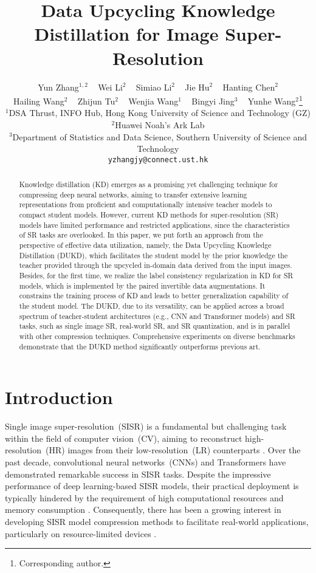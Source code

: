 \documentclass[10pt,twocolumn,letterpaper]{article}
\title{Data Upcycling Knowledge Distillation for Image Super-Resolution}
\author{\hspace{-0.4cm}Yun Zhang$^{1,2}$ ~ Wei Li$^{2}$  ~ Simiao Li$^{2}$ ~ Jie Hu$^{2}$ ~ Hanting Chen$^{2}$\\
	\hspace{-0.4cm}Hailing Wang$^{2}$ ~ Zhijun Tu$^{2}$ ~ Wenjia Wang$^{1}$ ~ Bingyi Jing$^{3}$ ~ Yunhe Wang$^{2}$\thanks{Corresponding author.}\\
	$^{1}$DSA Thrust, INFO Hub, Hong Kong University of Science and Technology (GZ)\\
	$^{2}$Huawei Noah's Ark Lab\\
	$^{3}$Department of Statistics and Data Science, Southern University of Science and Technology\\
	{\tt\hspace{-0.6cm}yzhangjy@connect.ust.hk}\quad\quad {\tt\{wei.lee, lisimiao\}@huawei.com}
}
\begin{document}
\maketitle

\begin{abstract}
\noindent Knowledge distillation (KD) emerges as a  promising yet challenging technique for compressing deep neural networks, aiming to transfer extensive learning representations from proficient and computationally intensive teacher models to compact student models.
However, current KD methods for super-resolution (SR) models have limited performance and restricted applications, since the characteristics of SR tasks are overlooked.
In this paper, we put forth an approach from the perspective of effective data utilization, namely, the Data Upcycling Knowledge Distillation (DUKD), which facilitates the student model by the prior knowledge the teacher provided through the upcycled in-domain data derived from the input images.
Besides, for the first time, we realize the label consistency regularization in KD for SR models, which is implemented by the paired invertible data augmentations. It constrains the training process of KD and leads to better generalization capability of  the student model.
The DUKD, due to its versatility, can be applied across a broad spectrum of teacher-student architectures (e.g., CNN and Transformer models) and SR tasks, such as single image SR, real-world SR, and SR quantization, and is in parallel with other compression techniques. 
Comprehensive experiments on diverse benchmarks demonstrate that the DUKD method significantly outperforms previous art.
\end{abstract} \section{Introduction}\label{sec: introduction}

Single image super-resolution~(SISR) is a fundamental but challenging task within the field of computer vision~(CV), aiming to reconstruct high-resolution~(HR) images from their low-resolution~(LR) counterparts \cite{lim2017enhanced, zhang2018image, liang2021swinir}. Over the past decade, convolutional neural networks~(CNNs) \cite{dong2015image, kim2016accurate,lim2017enhanced,zhang2018image} and Transformers \cite{liang2021swinir, yang2020learning, wang2022uformer,zamir2022restormer} have demonstrated remarkable success in SISR tasks. Despite the impressive performance of deep learning-based SISR models, their practical deployment is typically hindered by the requirement of high computational resources and memory consumption \cite{zhang2021aligned}. Consequently, there has been a growing interest in developing SISR model compression methods to facilitate real-world applications, particularly on resource-limited devices \cite{Huang_2023_CVPR}. 
\end{document}
